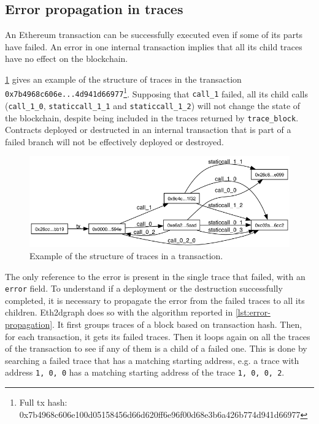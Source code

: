 \subsection{Error propagation in traces}

An Ethereum transaction can be successfully executed even if some of its parts have failed. An error in one internal transaction implies that all its child traces have no effect on the blockchain. 

\cref{fig:traces} gives an example of the structure of traces in the transaction {\tt 0x7b4968c606e...4d941d66977}\footnote{Full tx hash: 0x7b4968c606e100d05158456d66d620ff6e96f00d68e3b6a426b774d941d66977}. Supposing that {\tt call\_1} failed, all its child calls ({\tt call\_1\_0}, {\tt staticcall\_1\_1} and {\tt staticcall\_1\_2}) will not change the state of the blockchain, despite being included in the traces returned by {\tt trace\_block}. Contracts deployed or destructed in an internal transaction that is part of a failed branch will not be effectively deployed or destroyed. 

\begin{figure}[H]
  \centering
  \includegraphics[width=1\textwidth]{Figures/methods/traces.png}
  \caption{Example of the structure of traces in a transaction.}
  \label{fig:traces}
\end{figure}

The only reference to the error is present in the single trace that failed, with an {\tt error} field. To understand if a deployment or the destruction successfully completed, it is necessary to propagate the error from the failed traces to all its children. Eth2dgraph does so with the algorithm reported in \cref{lst:error-propagation}. It first groups traces of a block based on transaction hash. Then, for each transaction, it gets its failed traces. Then it loops again on all the traces of the transaction to see if any of them is a child of a failed one. This is done by searching a failed trace that has a matching starting address, e.g. a trace with address {\tt 1, 0, 0} has a matching starting address of the trace {\tt 1, 0, 0, 2}.

